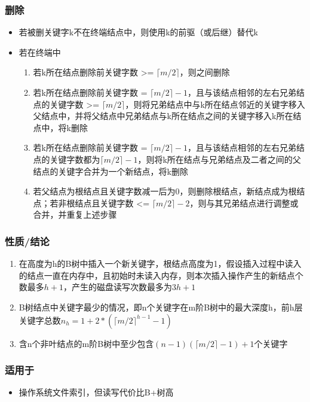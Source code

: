\subsubsection{删除}
\begin{itemize}
    \item 若被删关键字k不在终端结点中，则使用k的前驱（或后继）替代k
    \item 若在终端中\begin{enumerate}
        \item 若k所在结点删除前关键字数 >= \(\lceil m / 2\rceil\)，则之间删除
        \item 若k所在结点删除前关键字数 = \(\lceil m / 2\rceil - 1\)，且与该结点相邻的左右兄弟结点的关键字数 >= \(\lceil m / 2\rceil\)，则将兄弟结点中与k所在结点邻近的关键字移入父结点中，并将父结点中兄弟结点与k所在结点之间的关键字移入k所在结点中，将k删除
        \item 若k所在结点删除前关键字数 = \(\lceil m / 2\rceil - 1\)，且与该结点相邻的左右兄弟结点的关键字数都为\(\lceil m / 2\rceil - 1\)，则将k所在结点与兄弟结点及二者之间的父结点的关键字合并为一个新结点，将k删除
        \item 若父结点为根结点且关键字数减一后为0，则删除根结点，新结点成为根结点；若非根结点且关键字数 <= \(\lceil m / 2\rceil - 2\)，则与其兄弟结点进行调整或合并，并重复上述步骤
    \end{enumerate}
\end{itemize}


\subsubsection{性质/结论}
\begin{enumerate}
    \item 在高度为h的B树中插入一个新关键字，根结点高度为1，假设插入过程中读入的结点一直在内存中，且初始时未读入内存，则本次插入操作产生的新结点个数最多\(h + 1\)，产生的磁盘读写次数最多为\(3h + 1\)
    \item B树结点中关键字最少的情况，即n个关键字在m阶B树中的最大深度h，前h层关键字总数\(n_h = 1 + 2 * (\lceil m / 2\rceil^{h - 1} - 1)\)
    \item 含n个非叶结点的m阶B树中至少包含\((n - 1)(\lceil m / 2\rceil - 1) + 1\)个关键字
\end{enumerate}


\subsubsection{适用于}
\begin{itemize}
    \item 操作系统文件索引，但读写代价比B+树高
\end{itemize}


